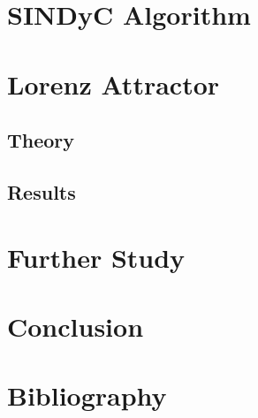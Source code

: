 \documentclass[12pt,preprintnumbers,amsmath,amssymb,titlepage]{report}
\begin{document}

\section*{SINDyC Algorithm}



\section*{Lorenz Attractor}

\subsection*{Theory}

\subsection*{Results}



\section{Further Study}

\section*{Conclusion}

\section*{Bibliography}


\end{document}
